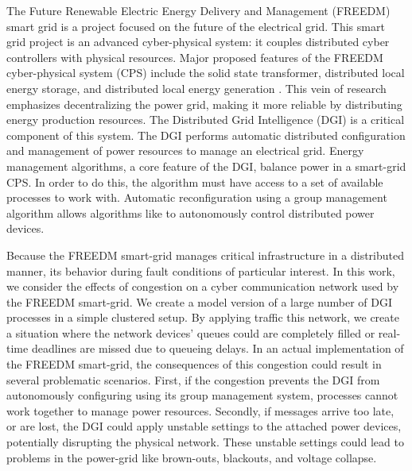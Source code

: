 
The Future Renewable Electric Energy Delivery and Management (FREEDM) smart grid is a project focused on the future of the electrical grid.
This smart grid project is an advanced cyber-physical system: it couples distributed cyber controllers with physical resources.
Major proposed features of the FREEDM cyber-physical system (CPS) include the solid state transformer, distributed local energy storage, and distributed local energy generation \cite{FREEDMMIGRATION}.
This vein of research emphasizes decentralizing the power grid, making it more reliable by distributing energy production resources.
The Distributed Grid Intelligence (DGI) is a critical component of this system.
The DGI performs automatic distributed configuration and management of power resources to manage an electrical grid.
Energy management algorithms, a core feature of the DGI\cite{LOADBALANCING}, balance power in a smart-grid CPS.
In order to do this, the algorithm must have access to a set of available processes to work with.
Automatic reconfiguration using a group management algorithm allows algorithms like \cite{LOADBALANCING}\cite{ICC1}\cite{MOYEEN} to autonomously control distributed power devices.

Because the FREEDM smart-grid manages critical infrastructure in a distributed manner, its behavior during fault conditions of particular interest.
In this work, we consider the effects of congestion on a cyber communication network used by the FREEDM smart-grid.
We create a model version of a large number of DGI processes in a simple clustered setup.
By applying traffic this network, we create a situation where the network devices' queues could are completely filled or real-time deadlines are missed due to queueing delays.
In an actual implementation of the FREEDM smart-grid, the consequences of this congestion could result in several problematic scenarios.
First, if the congestion prevents the DGI from autonomously configuring using its group management system, processes cannot work together to manage power resources.
Secondly, if messages arrive too late, or are lost, the DGI could apply unstable settings to the attached power devices, potentially disrupting the physical network.
These unstable settings could lead to problems in the power-grid like brown-outs, blackouts, and voltage collapse.

